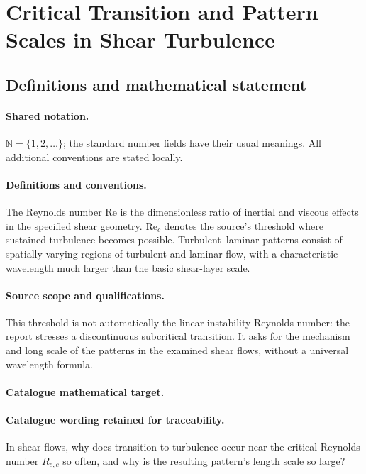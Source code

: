 \documentclass[11pt]{article}
\begin{document}
\section{Critical Transition and Pattern Scales in Shear Turbulence}\label{statement}

\subsection{Definitions and mathematical statement}

\paragraph{Shared notation.}$\mathbb N=\{1,2,\ldots\}$; the standard number fields have their usual meanings. All additional conventions are stated locally.


\paragraph{Definitions and conventions.} The Reynolds number $\mathrm{Re}$ is the dimensionless ratio of inertial and viscous effects in the specified shear geometry. $\mathrm{Re}_c$ denotes the source's threshold where sustained turbulence becomes possible. Turbulent--laminar patterns consist of spatially varying regions of turbulent and laminar flow, with a characteristic wavelength much larger than the basic shear-layer scale.

\paragraph{Source scope and qualifications.} This threshold is not automatically the linear-instability Reynolds number: the report stresses a discontinuous subcritical transition. It asks for the mechanism and long scale of the patterns in the examined shear flows, without a universal wavelength formula.

\paragraph{Catalogue mathematical target.}
\paragraph{Catalogue wording retained for traceability.}
In shear flows, why does transition to turbulence occur near the critical Reynolds number $R_{e,c}$ so often, and why is the resulting pattern's length scale so large?
\end{document}
